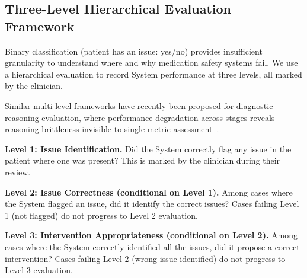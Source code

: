 
\subsection{Three-Level Hierarchical Evaluation Framework}

    Binary classification (patient has an issue: yes/no) provides insufficient granularity to understand where and why medication safety systems fail. We use a hierarchical evaluation to record System performance at three levels, all marked by the clinician.

    Similar multi-level frameworks have recently been proposed for diagnostic reasoning evaluation, where performance degradation across stages reveals reasoning brittleness invisible to single-metric assessment~\cite{Qiu2025}. 

    \textbf{Level 1: Issue Identification.} Did the System correctly flag any issue in the patient where one was present? This is marked by the clinician during their review.

    \textbf{Level 2: Issue Correctness (conditional on Level 1).} Among cases where the System flagged an issue, did it identify the correct issues? Cases failing Level 1 (not flagged) do not progress to Level 2 evaluation.

    \textbf{Level 3: Intervention Appropriateness (conditional on Level 2).} Among cases where the System correctly identified all the issues, did it propose a correct intervention? Cases failing Level 2 (wrong issue identified) do not progress to Level 3 evaluation.


